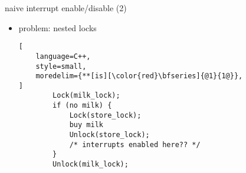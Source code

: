 \begin{frame}[fragile,label=naiveEnableDisable2]{naive interrupt enable/disable (2)}
\begin{itemize}
\item<4-> problem: nested locks
\begin{lstlisting}[
    language=C++,
    style=small,
    moredelim={**[is][\color{red}\bfseries]{@1}{1@}},
]    
        Lock(milk_lock);
        if (no milk) {
            Lock(store_lock);
            buy milk
            Unlock(store_lock);
            /* interrupts enabled here?? */
        }
        Unlock(milk_lock);
\end{lstlisting}
\end{itemize}
\end{frame}

